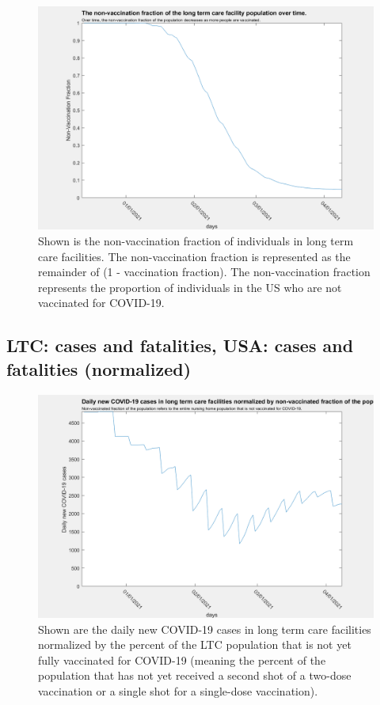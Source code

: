 \documentclass[twoside]{article}
\begin{document}
\begin{multicols}{2}
\begin{figure}[H]
	\includegraphics[width=\linewidth]{images/non_vac_fraction_LTC.png}
	\caption{Shown is the non-vaccination fraction of individuals in long term care facilities. The non-vaccination fraction is represented as the remainder of (1 - vaccination fraction). The non-vaccination fraction represents the proportion of individuals in the US who are not vaccinated for COVID-19.}
	\label{fig:images/non_vac_fraction_LTCLabel}
\end{figure}

\subsection{LTC: cases and fatalities, USA: cases and fatalities (normalized)}

\begin{figure}[H]
	\includegraphics[width=\linewidth]{images/ltc_normalized_cases_vf.png}
	\caption{Shown are the daily new COVID-19 cases in long term care facilities normalized by the percent of the LTC population that is not yet fully vaccinated for COVID-19 (meaning the percent of the population that has not yet received a second shot of a two-dose vaccination or a single shot for a single-dose vaccination).}
	\label{fig:images/ltc_normalized_cases_vfLabel}
\end{figure}


\end{multicols}
\end{document}
